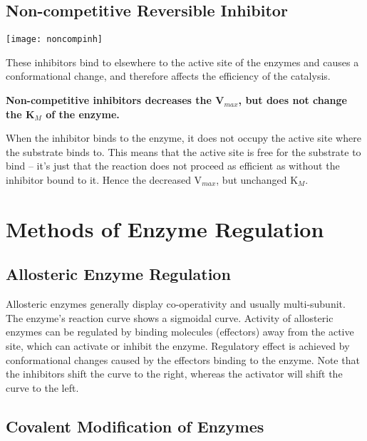 \documentclass[a4paper, 12pt]{report}
\begin{document}
\subsection{Non-competitive Reversible Inhibitor}

\begin{center}
\texttt{[image: noncompinh]}
\end{center}

These inhibitors bind to elsewhere to the active site of the enzymes and causes a conformational change, and therefore affects the efficiency of the catalysis.

\begin{center}
\textbf{Non-competitive inhibitors decreases the V$_{max}$, but does not change the K$_M$ of the enzyme.}
\end{center}

When the inhibitor binds to the enzyme, it does not occupy the active site where the substrate binds to.
This means that the active site is free for the substrate to bind -- it's just that the reaction does not proceed as efficient as without the inhibitor bound to it.
Hence the decreased V$_{max}$, but unchanged K$_M$.

\section{Methods of Enzyme Regulation}

\subsection{Allosteric Enzyme Regulation}

Allosteric enzymes generally display co-operativity and usually multi-subunit.
The enzyme's reaction curve shows a sigmoidal curve.
Activity of allosteric enzymes can be regulated by binding molecules (effectors) away from the active site, which can activate or inhibit the enzyme.
Regulatory effect is achieved by conformational changes caused by the effectors binding to the enzyme.
Note that the inhibitors shift the curve to the right, whereas the activator will shift the curve to the left.

\subsection{Covalent Modification of Enzymes}
\end{document}
